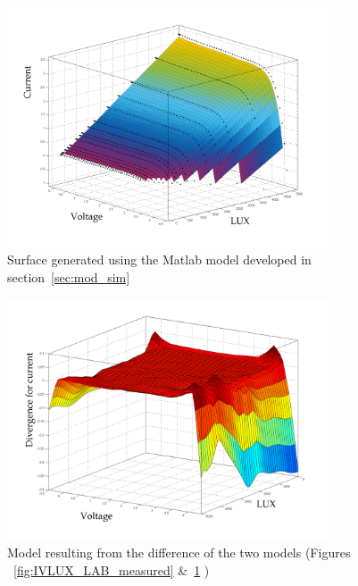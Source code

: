 \begin{figure}[H]
  \begin{center}
	  \includegraphics[width=0.85\textwidth]{images/IVLUX_MOD_gen}
	  \caption{Surface generated using the Matlab model developed in section~\ref{sec:mod_sim}}
	  \label{fig:IVLUX_MOD_gen}
  \end{center}
\end{figure}
              

\begin{figure}[H]
  \begin{center}
	  \includegraphics[width=0.85\textwidth]{images/Diff_Contour}
	  \caption{Model resulting from the difference of the two models (Figures ~\ref{fig:IVLUX_LAB_measured} \&~\ref{fig:IVLUX_MOD_gen} )}
	  \label{fig:Diff_Contour}
  \end{center}
\end{figure}


